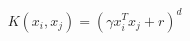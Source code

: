 \documentclass[preview]{standalone}
\begin{document}
\begin{align*}
K(x_i, x_j) = (\gamma x_i^T x_j + r)^d
\end{align*}
\end{document}
